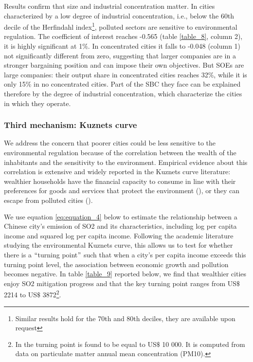 \documentclass[12pt]{article}
\begin{document}
Results confirm that size and industrial concentration matter. In cities characterized by a low degree of industrial concentration, i.e., below the 60th decile of the Herfindahl index\footnote{ Similar results hold for the 70th and 80th deciles, they are available upon request }, polluted sectors are sensitive to environmental regulation. The coefficient of interest reaches -0.565 (table \ref{table_8}, column 2), it is highly significant at 1$\%$. In concentrated cities it falls to -0.048 (column 1) not significantly different from zero, suggesting that larger companies are in a stronger bargaining position and can impose their own objectives. But SOEs are large companies: their output share in concentrated cities reaches 32\%, while it is only 15\% in no concentrated cities. Part of the SBC  they face can be explained therefore by the degree of industrial concentration, which characterize the cities in which they operate. 

\subsubsection{Third mechanism: Kuznets curve}



We address the concern that poorer cities could be less sensitive to the environmental regulation because of the correlation between the wealth of the inhabitants and the sensitivity to the environment. Empirical evidence about this correlation is extensive and widely reported in the Kuznets curve literature: wealthier households have the financial capacity to consume in line with their preferences for goods and services that protect the environment (\citealt{Berger2019-jl,Chen2018-ki}), or they can escape from polluted cities (\citealt{Chen2017-ro}).


We use equation \ref{eq:equation_4} below to estimate the relationship between a Chinese city's emission of SO2 and its characteristics, including log per capita income and squared log per capita income. Following the academic literature studying the environmental Kuznets curve, this allows us to test for whether there is a $``$turning point$"$ such that when a city's per capita income exceeds this turning point level, the association between economic growth and pollution becomes negative. In table \ref{table_9} reported below, we find that wealthier cities enjoy SO2 mitigation progress and that the key turning point ranges from US$\$$ 2214 to US$\$$ 3872\footnote{In \cite{Kahn2016-fi} the turning point is found to be equal to US$\$$ 10 000. It is computed from data on particulate matter annual mean concentration (PM10).}. 
\end{document}

